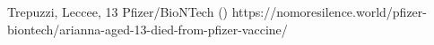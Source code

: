           {Trepuzzi, Leccee, }
          {13}
          {Pfizer/BioNTech}
          {}
          {
             ()
          }
          {https://nomoresilence.world/pfizer-biontech/arianna-aged-13-died-from-pfizer-vaccine/}


